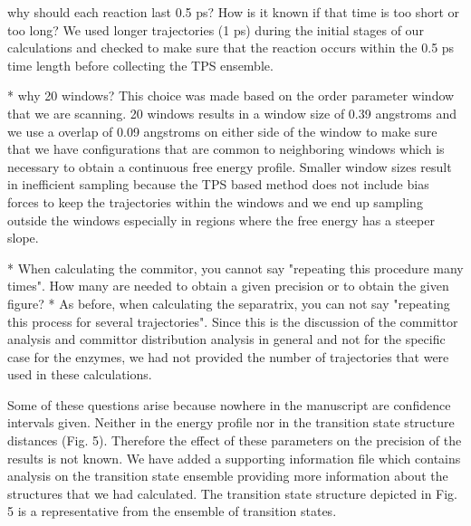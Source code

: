 \documentclass[journal=jpcbfk,manuscript=article,layout=traditional]{achemso}
\begin{document}
\begin{response}
  {why should each reaction last 0.5 ps? How is it known if that time is too short 
  or too long?}
We used longer trajectories (1 ps) during the initial stages of our calculations
and checked to make sure that the reaction occurs within
the 0.5 ps time length before collecting the TPS ensemble. 
\end{response}

{\begin{response}
{* why 20 windows?}
This choice was made based on the order parameter window that we are scanning.
20 windows results in a window size of 0.39 angstroms and we use a overlap of
0.09 angstroms on either side of the window to make sure that we have configurations
that are common to neighboring windows which is necessary to obtain a continuous free energy
profile. Smaller window sizes result in inefficient sampling because the TPS based method
does not include bias forces to keep the trajectories within the windows and we end up
sampling outside the windows especially in regions where the free energy has a steeper slope.  
\end{response}

\begin{response}
{* When calculating the commitor, you cannot say "repeating this procedure many times". 
How many are needed to obtain a given precision or to obtain the given figure?
\newline
* As before, when calculating the separatrix, you can not say "repeating this 
process for several trajectories".}
Since this is the discussion of the committor analysis and committor distribution 
analysis in general and not for the specific case for the enzymes, we had not
provided the number of trajectories that were used in these calculations. 
\end{response}

\begin{response}{Some of these questions arise because nowhere in 
the manuscript are confidence intervals given. Neither in the energy 
profile nor in the transition state structure distances (Fig. 5). 
Therefore the effect of these parameters on the precision of the 
results is not known.
}
We have added a supporting information file which contains analysis on the transition
state ensemble providing more information about the structures that we had calculated. 
The transition state structure depicted in Fig. 5 is a representative
from the ensemble of transition states.
\end{response}

}
\end{document}
